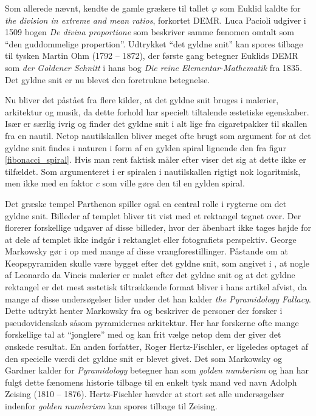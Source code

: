 {
Som allerede nævnt, kendte de gamle grækere til tallet $\varphi$ som
Euklid kaldte for \emph{the division in extreme and mean ratios},
forkortet DEMR. Luca Pacioli udgiver i 1509 bogen \emph{De divina
proportione} som beskriver samme fænomen omtalt som ``den guddommelige
propertion''. Udtrykket ``det gyldne snit'' kan spores tilbage til
tysken Martin Ohm (1792 -- 1872), der første gang betegner Euklids DEMR
som \emph{der Goldener Schnitt} i hans bog \emph{Die reine
Elementar-Mathematik} fra 1835\cite{Markowsky1992}. Det gyldne snit er
nu blevet den foretrukne betegnelse.

Nu bliver det påstået fra flere kilder, at det gyldne snit bruges i
malerier, arkitektur og musik, da dette forhold har specielt tiltalende
æstetiske
egenskaber\cite{GoldenNumber}\cite{RatioArt}\cite{Putz1995}\cite{Stakhov2006490}\cite{Boussora2004}.
Især \cite{GoldenNumber} er særlig ivrig og finder det gyldne snit i alt
lige fra cigaretpakker til skallen fra en nautil. Netop nautilskallen
bliver meget ofte brugt som argument for at det gyldne snit findes i
naturen i form af en gylden spiral lignende den fra figur
\ref{fibonacci_spiral}. Hvis man rent faktisk måler efter
viser det sig at dette ikke er tilfældet. Som argumenteret i
\cite{Sharp2002} er spiralen i nautilskallen rigtigt nok logaritmisk,
men ikke med en faktor $c$ som ville gøre den til en gylden spiral.

Det græske tempel Parthenon spiller også en central rolle i rygterne om
det gyldne snit. Billeder af templet bliver tit vist med et rektangel
tegnet over. Der florerer forskellige udgaver af disse billeder, hvor
der åbenbart ikke tages højde for at dele af templet ikke indgår i
rektanglet eller fotografiets perspektiv. George Markowsky gør i
\cite{Markowsky1992} op med mange af disse vrangforestillinger. Påstande
om at Keopspyramiden skulle være bygget efter det gyldne snit, som
angivet i \cite{Stakhov2006490}, at nogle af Leonardo da Vincis malerier
er malet efter det gyldne snit og at det gyldne rektangel er det mest
æstetisk tiltrækkende format\cite{GoldenNumber}\cite{RatioArt} bliver i
hans artikel afvist, da mange af disse undersøgelser lider under det han
kalder \emph{the Pyramidology Fallacy}. Dette udtrykt henter Markowsky
fra \cite{Gardner1952_2} og beskriver de personer der forsker i
pseudovidenskab såsom pyramidernes arkitektur. Her har forskerne ofte
mange forskellige tal at ``jonglere'' med og kan frit vælge netop dem
der giver det ønskede resultat. En anden forfatter, Roger
Hertz-Fischler, er ligeledes optaget af den specielle værdi det gyldne
snit er blevet givet. Det som Markowsky og Gardner kalder for
\emph{Pyramidology} betegner han som \emph{golden numberism} og han har
fulgt dette fænomens historie tilbage til en enkelt tysk mand ved navn
Adolph Zeising (1810 -- 1876)\cite{Herz-Fischler2005}. Hertz-Fischler
hævder at stort set alle undersøgelser indenfor \emph{golden numberism}
kan spores tilbage til Zeising.

}
